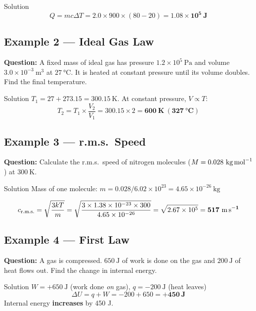 \begin{examplebox}{Solution}
$$Q = mc\Delta T = 2.0 \times 900 \times (80-20) = \mathbf{1.08 \times 10^5\ \text{J}}$$
\end{examplebox}

\subsection*{Example 2 --- Ideal Gas Law}

\textbf{Question:} A fixed mass of ideal gas has pressure $1.2\times10^5\ \text{Pa}$ and volume $3.0\times10^{-3}\ \text{m}^3$ at $27\ \text{°C}$. It is heated at constant pressure until its volume doubles. Find the final temperature.

\begin{examplebox}{Solution}
$T_1 = 27 + 273.15 = 300.15\ \text{K}$. At constant pressure, $V \propto T$:
$$T_2 = T_1 \times \frac{V_2}{V_1} = 300.15 \times 2 = \mathbf{600\ \text{K}\ (327\ \text{°C})}$$
\end{examplebox}

\subsection*{Example 3 --- r.m.s.\ Speed}

\textbf{Question:} Calculate the r.m.s.\ speed of nitrogen molecules ($M = 0.028\ \text{kg\,mol}^{-1}$) at $300\ \text{K}$.

\begin{examplebox}{Solution}
Mass of one molecule: $m = 0.028/6.02\times10^{23} = 4.65\times10^{-26}\ \text{kg}$

$$c_\text{r.m.s.} = \sqrt{\frac{3kT}{m}} = \sqrt{\frac{3 \times 1.38\times10^{-23} \times 300}{4.65\times10^{-26}}} = \sqrt{2.67\times10^5} = \mathbf{517\ \text{m\,s}^{-1}}$$
\end{examplebox}

\subsection*{Example 4 --- First Law}

\textbf{Question:} A gas is compressed. $650\ \text{J}$ of work is done on the gas and $200\ \text{J}$ of heat flows out. Find the change in internal energy.

\begin{examplebox}{Solution}
$W = +650\ \text{J}$ (work done \emph{on} gas), \quad $q = -200\ \text{J}$ (heat leaves)
$$\Delta U = q + W = -200 + 650 = \mathbf{+450\ \text{J}}$$
Internal energy \textbf{increases} by 450 J.
\end{examplebox}

